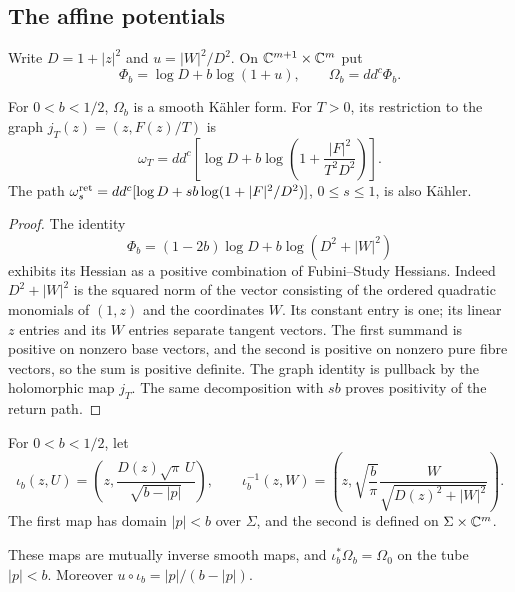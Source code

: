 \subsection{The affine potentials}\label{sec:vtr-bundle}

Write $D=1+|z|^2$ and $u=|W|^2/D^2$. On $\mathbb{C}^{m+1}\times\mathbb{C}^m$ put
\[
 \Phi_b=\log D+b\log(1+u),\qquad \Omega_b=dd^c\Phi_b.
\]

\begin{lemma}\label{lem:vtr-form}
For $0<b<1/2$, $\Omega_b$ is a smooth Kähler form. For $T>0$, its restriction to the graph
$j_T(z)=(z,F(z)/T)$ is
\[
 \omega_T=dd^c\!\left[\log D+b\log\left(1+\frac{|F|^2}{T^2D^2}\right)\right].
\]
The path $\omega_s^{\rm ret}=dd^c[\log D+sb\log(1+|F|^2/D^2)]$, $0\le s\le1$, is also Kähler.
\end{lemma}

\begin{proof}
The identity
\[
 \Phi_b=(1-2b)\log D+b\log(D^2+|W|^2)
\]
exhibits its Hessian as a positive combination of Fubini--Study Hessians.
Indeed $D^2+|W|^2$ is the squared norm of the vector consisting of the ordered quadratic monomials
of $(1,z)$ and the coordinates $W$. Its constant entry is one; its linear $z$ entries and its $W$ entries
separate tangent vectors. The first summand is positive on nonzero base vectors, and the second is positive
on nonzero pure fibre vectors, so the sum is positive definite. The graph identity is pullback by the holomorphic
map $j_T$. The same decomposition with $sb$ proves positivity of the return path.
\end{proof}

\begin{construction}\label{cons:vtr-injection}
For $0<b<1/2$, let
\[
 \iota_b(z,U)=\left(z,\frac{D(z)\sqrt\pi\,U}{\sqrt{b-|p|}}\right),\qquad
 \iota_b^{-1}(z,W)=\left(z,\sqrt{\frac b\pi}\frac{W}{\sqrt{D(z)^2+|W|^2}}\right).
\]
The first map has domain $|p|<b$ over $\Sigma$, and the second is defined on $\Sigma\times\mathbb{C}^m$.
\end{construction}

\begin{lemma}\label{lem:vtr-injection}
These maps are mutually inverse smooth maps, and $\iota_b^*\Omega_b=\Omega_0$ on the tube $|p|<b$.
Moreover $u\circ\iota_b=|p|/(b-|p|)$.
\end{lemma}


